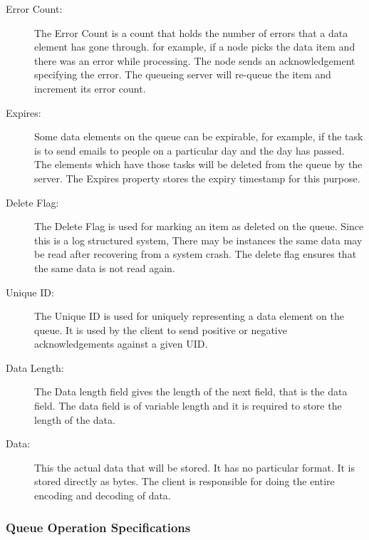 \documentclass[12pt,a4paper]{article}
\begin{document}
\begin{description}
    \item [Error Count:] 
    The Error Count is a count that holds the number of errors that a data element has gone through. for example, if a node picks the data item and there was an error while processing. The node sends an acknowledgement specifying the error. The queueing server will re-queue the item and increment its error count.
    
    \item [Expires:]
    Some data elements on the queue can be expirable, for example, if the task is to send emails to people on a particular day and the day has passed. The elements which have those tasks will be deleted from the queue by the server. The Expires property stores the expiry timestamp for this purpose.
    
    \item [Delete Flag:]
    The Delete Flag is used for marking an item as deleted on the queue. Since this is a log structured system, There may be instances the same data may be read after recovering from a system crash. The delete flag ensures that the same data is not read again.
    
    \item [Unique ID:]
    The Unique ID is used for uniquely representing a data element on the queue. It is used by the client to send positive or negative acknowledgements against a given UID. 
	
	 \item [Data Length:]
	The Data length field gives the length of the next field, that is the data field. The data field is of variable length and it is required to store the length of the data.
	
	 \item [Data:]
	 This the actual data that will be stored. It has no particular format. It is stored directly as bytes. The client is responsible for doing the entire encoding and decoding of data.

\end{description} 

\subsubsection{Queue Operation Specifications}
\end{document}
